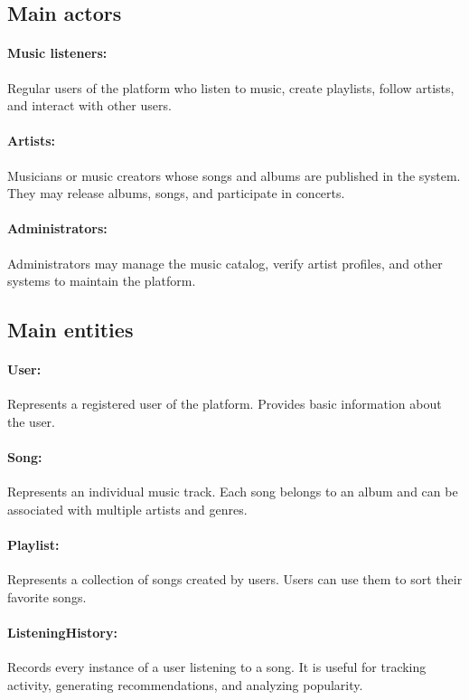 \documentclass[11pt, a4paper]{article}
\begin{document}
\subsection{Main actors}
\paragraph{Music listeners:} Regular users of the platform who listen to music, create playlists, follow artists, and interact with other users.
\paragraph{Artists:} Musicians or music creators whose songs and albums are published in the system. They may release albums, songs, and participate in concerts.
\paragraph{Administrators:} Administrators may manage the music catalog, verify artist profiles, and other systems to maintain the platform.

\subsection{Main entities}
\paragraph{User:} Represents a registered user of the platform. Provides basic information about the user.
\paragraph{Song:} Represents an individual music track. Each song belongs to an album and can be associated with multiple artists and genres.
\paragraph{Playlist:} Represents a collection of songs created by users. Users can use them to sort their favorite songs.
\paragraph{ListeningHistory:} Records every instance of a user listening to a song. It is useful for tracking activity, generating recommendations, and analyzing popularity.
\end{document}
